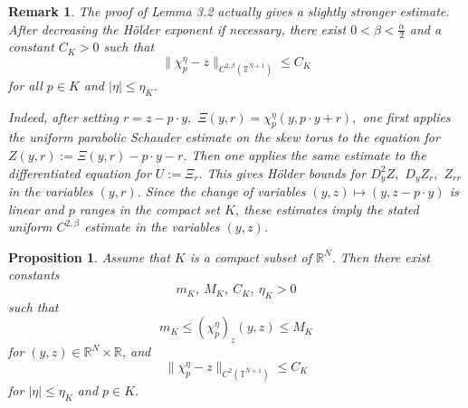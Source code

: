 \documentclass[preprint]{elsarticle}
\newtheorem{proposition}{Proposition}[section]
\newtheorem{remark}{Remark}[section]
\numberwithin{equation}{section}
\begin{document}
\begin{remark}\label{rem:C2beta-corrector}
The proof of Lemma 3.2 actually gives a slightly stronger estimate. After decreasing the Hölder exponent if necessary, there exist
$
0<\beta<\frac{\alpha}{2}
$
and a constant $C_K>0$ such that
\begin{equation*}
\|\chi_p^\eta-z\|_{C^{2,\beta}(\mathbb T^{N+1})}\le C_K
\end{equation*}
for all $p\in K$ and $|\eta|\le\eta_K$.

Indeed, after setting
$
r=z-p\cdot y,
$ $
\Xi(y,r)=\chi_p^\eta(y,p\cdot y+r),
$
one first applies the uniform parabolic Schauder estimate on the skew torus to the equation for
$
Z(y,r):=\Xi(y,r)-p\cdot y-r.
$
Then one applies the same estimate to the differentiated equation for
$
U:=\Xi_r.
$
This gives Hölder bounds for
$
D_y^2Z,$ $ D_yZ_r,$ $ Z_{rr}
$
in the variables $(y,r)$. Since the change of variables
$
(y,z)\mapsto (y,z-p\cdot y)
$
is linear and $p$ ranges in the compact set $K$, these estimates imply the stated uniform $C^{2,\beta}$ estimate in the variables $(y,z)$.
\end{remark}
\begin{proposition}
Assume that $K$ is a compact subset of $\mathbb R^N$. Then there exist constants
$$
m_K,\ M_K,\ C_K,\ \eta_K>0
$$
such that
\begin{equation*}
m_K\le(\chi_p^\eta)_z(y,z)\le M_K
\end{equation*}
for $(y,z)\in\mathbb R^N\times\mathbb R$, and
\begin{equation*}
\|\chi_p^\eta-z\|_{C^2(\mathbb T^{N+1})}\le C_K
\end{equation*}
for $|\eta|\le\eta_K$ and $p\in K$.
\end{proposition}
\end{document}
